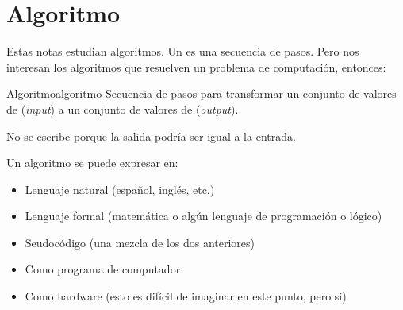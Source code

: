 \section{Algoritmo}

Estas notas estudian algoritmos. Un  es una secuencia de pasos. Pero nos interesan los algoritmos que resuelven un problema de computación, entonces:

\begin{definicion}{Algoritmo}{algoritmo}
Secuencia de pasos para transformar un conjunto de valores de  (\textit{input}) a un conjunto de valores de  (\textit{output}).
\end{definicion}
No se escribe  porque la salida podría ser igual a la entrada.

Un algoritmo se puede expresar en:
\begin{itemize}
  \item Lenguaje natural (español, inglés, etc.)
  \item Lenguaje formal (matemática o algún lenguaje de programación o lógico)
  \item Seudocódigo (una mezcla de los dos anteriores)
  \item Como programa de computador
  \item Como hardware (esto es difícil de imaginar en este punto, pero sí)
\end{itemize}
